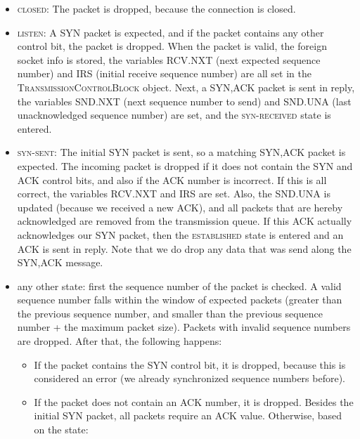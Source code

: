 \documentclass{hitec}
\newcommand{\classname}[1]{\textsc{#1}}
\newcommand{\state}[1]{\textsc{#1}}
\begin{document}
\begin{itemize}
  \item \state{closed}: The packet is dropped, because the connection is closed.
  
  \item \state{listen}: A SYN packet is expected, and if the packet contains any other control bit, the packet is dropped. When the packet is valid, the foreign socket info is stored, the variables RCV.NXT (next expected sequence number) and IRS (initial receive sequence number) are all set in the \classname{TransmissionControlBlock} object. Next, a SYN,ACK packet is sent in reply, the variables SND.NXT (next sequence number to send) and SND.UNA (last unacknowledged sequence number) are set, and the \state{syn-received} state is entered.
  
  \item \state{syn-sent}: The initial SYN packet is sent, so a matching SYN,ACK packet is expected. The incoming packet is dropped if it does not contain the SYN and ACK control bits, and also if the ACK number is incorrect. If this is all correct, the variables RCV.NXT and IRS are set. Also, the SND.UNA is updated (because we received a new ACK), and all packets that are hereby acknowledged are removed from the transmission queue. If this ACK actually acknowledges our SYN packet, then the \state{established} state is entered and an ACK is sent in reply. Note that we do drop any data that was send along the SYN,ACK message.
  
  \item any other state: first the sequence number of the packet is checked. A valid sequence number falls within the window of expected packets (greater than the previous sequence number, and smaller than the previous sequence number +  the maximum packet size). Packets with invalid sequence numbers are dropped. After that, the following happens: 
  
  \begin{itemize}
    \item If the packet contains the SYN control bit, it is dropped, because this is considered an error (we already synchronized sequence numbers before). 
    \item If the packet does not contain an ACK number, it is dropped. Besides the initial SYN packet, all packets require an ACK value. Otherwise, based on the state:
    

\end{itemize}
\end{itemize}
\end{document}
